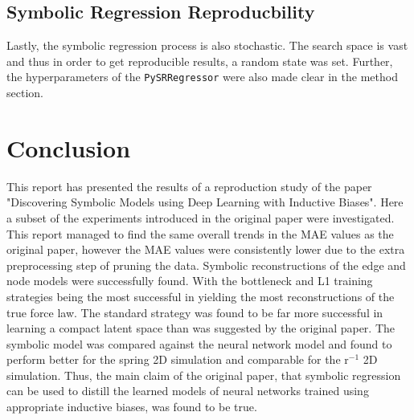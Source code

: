 \documentclass[11pt]{article}
\begin{document}
\subsection{Symbolic Regression Reproducbility}
Lastly, the symbolic regression process is also stochastic. The search space is vast and thus in order to get reproducible results, a random state was set. Further, the hyperparameters of the \texttt{PySRRegressor} were also made clear in the method section.



\section{Conclusion}
This report has presented the results of a reproduction study of the paper "Discovering Symbolic Models using Deep Learning with Inductive Biases". Here a subset of the experiments introduced in the original paper were investigated. This report managed to find the same overall trends in the MAE values as the original paper, however the MAE values were consistently lower due to the extra preprocessing step of pruning the data. Symbolic reconstructions of the edge and node models were successfully found. With the bottleneck and L1 training strategies being the most successful in yielding the most reconstructions of the true force law. The standard strategy was found to be far more successful in learning a compact latent space than was suggested by the original paper. The symbolic model was compared against the neural network model and found to perform better for the spring 2D simulation and comparable for the r$^{-1}$ 2D simulation. Thus, the main claim of the original paper, that symbolic regression can be used to distill the learned models of neural networks trained using appropriate inductive biases, was found to be true. 
    
\end{document}
